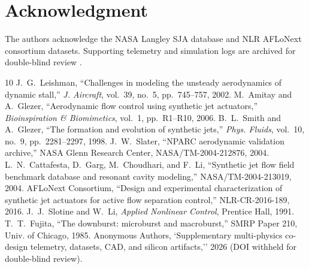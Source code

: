 \documentclass[journal,10pt,twocolumn]{IEEEtran}
\begin{document}
\section*{Acknowledgment}
The authors acknowledge the NASA Langley SJA database and NLR AFLoNext consortium datasets. Supporting telemetry and simulation logs are archived for double-blind review \cite{dixit2026zenodo}.

\begin{thebibliography}{10}
 J.~G.~Leishman, ``Challenges in modeling the unsteady aerodynamics of dynamic stall,'' \emph{J. Aircraft}, vol.~39, no.~5, pp.~745--757, 2002.
 M.~Amitay and A.~Glezer, ``Aerodynamic flow control using synthetic jet actuators,'' \emph{Bioinspiration \& Biomimetics}, vol.~1, pp.~R1--R10, 2006.
 B.~L.~Smith and A.~Glezer, ``The formation and evolution of synthetic jets,'' \emph{Phys. Fluids}, vol.~10, no.~9, pp.~2281--2297, 1998.
 J.~W.~Slater, ``NPARC aerodynamic validation archive,'' NASA Glenn Research Center, NASA/TM-2004-212876, 2004.
 L.~N.~Cattafesta, D.~Garg, M.~Choudhari, and F.~Li, ``Synthetic jet flow field benchmark database and resonant cavity modeling,'' NASA/TM-2004-213019, 2004.
 AFLoNext Consortium, ``Design and experimental characterization of synthetic jet actuators for active flow separation control,'' NLR-CR-2016-189, 2016.
 J.~J.~Slotine and W.~Li, \emph{Applied Nonlinear Control}, Prentice Hall, 1991.
 T.~T.~Fujita, ``The downburst: microburst and macroburst,'' SMRP Paper 210, Univ. of Chicago, 1985.
 Anonymous Authors, `Supplementary multi-physics co-design telemetry, datasets, CAD, and silicon artifacts,'' 2026 (DOI withheld for double-blind review).
\end{thebibliography}
\end{document}
